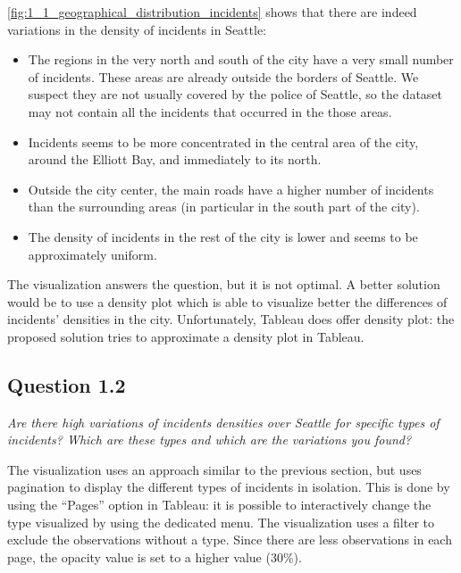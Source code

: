 \cref{fig:1_1_geographical_distribution_incidents} shows that there are indeed variations in the density of incidents in Seattle:
\begin{itemize}
    \item The regions in the very north and south of the city have a very small number of incidents. These areas are already outside the borders of Seattle. We suspect they are not usually covered by the police of Seattle, so the dataset may not contain all the incidents that occurred in the those areas.
    \item Incidents seems to be more concentrated in the central area of the city, around the Elliott Bay, and immediately to its north.
    \item Outside the city center, the main roads have a higher number of incidents than the surrounding areas (in particular in the south part of the city).
    \item The density of incidents in the rest of the city is lower and seems to be approximately uniform.
\end{itemize}

The visualization answers the question, but it is not optimal.
A better solution would be to use a density plot which is able to visualize better the differences of incidents' densities in the city.
Unfortunately, Tableau does offer density plot: the proposed solution tries to approximate a density plot in Tableau.

\subsection*{Question 1.2}
\textit{Are there high variations of incidents densities over Seattle for specific types of incidents? Which are these types and which are the variations you found?}

The visualization uses an approach similar to the previous section, but uses pagination to display the different types of incidents in isolation.
This is done by using the ``Pages'' option in Tableau:
it is possible to interactively change the type visualized by using the dedicated menu.
The visualization uses a filter to exclude the observations without a type.
Since there are less observations in each page, the opacity value is set to a higher value ($30\%$).

